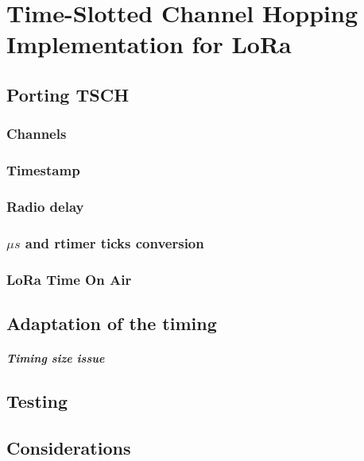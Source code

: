 \chapter{Time-Slotted Channel Hopping Implementation for LoRa\label{section:tsch}}

\section{Porting TSCH}

\subsection{Channels}

\subsection{Timestamp}

\subsection{Radio delay}

\subsection{$\mu s$ and rtimer ticks conversion}

\subsection{LoRa Time On Air}

\section{Adaptation of the timing}

\paragraph{Timing size issue}

\section{Testing}

\section{Considerations}
